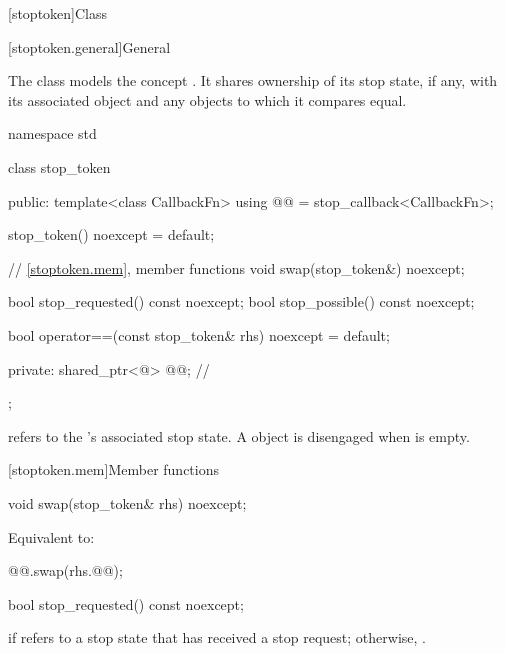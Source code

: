 [stoptoken]{Class }%
%

[stoptoken.general]{General}

\pnum
{}%
The class  models the concept .
It shares ownership of its stop state, if any,
with its associated  object and
any  objects to which it compares equal.

\begin{codeblock}
namespace std {
  class stop_token {
  public:
    template<class CallbackFn>
      using @@ = stop_callback<CallbackFn>;

    stop_token() noexcept = default;

    // \ref{stoptoken.mem}, member functions
    void swap(stop_token&) noexcept;

    bool stop_requested() const noexcept;
    bool stop_possible() const noexcept;

    bool operator==(const stop_token& rhs) noexcept = default;

  private:
    shared_ptr<@\unspec@> @@;                           // \expos
  };
}
\end{codeblock}

\pnum
{} refers to the 's associated stop state.
A  object is disengaged when  is empty.

[stoptoken.mem]{Member functions}

%
\begin{itemdecl}
void swap(stop_token& rhs) noexcept;
\end{itemdecl}

\begin{itemdescr}
\pnum
\effects
Equivalent to:
\begin{codeblock}
@@.swap(rhs.@@);
\end{codeblock}
\end{itemdescr}

%
\begin{itemdecl}
bool stop_requested() const noexcept;
\end{itemdecl}

\begin{itemdescr}
\pnum
\returns
{} if  refers to a stop state
that has received a stop request;
otherwise, .
\end{itemdescr}

